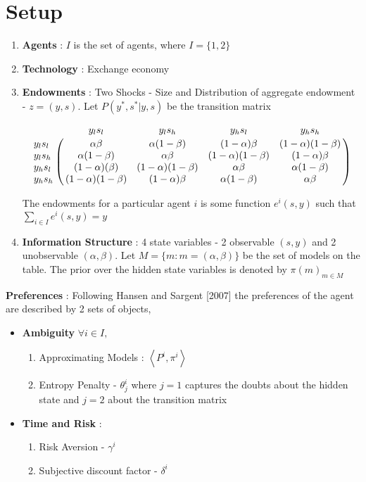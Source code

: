 \documentclass[12pt]{article}
\begin{document}
\section{Setup}
	\begin{enumerate}
		\item \textbf{Agents}  : $I$ is the  set of agents, where $I= \{1,2\}$
		\item \textbf{Technology} : Exchange economy
		\item \textbf{Endowments}  : Two Shocks - Size and Distribution of aggregate endowment - $z=(y,s)$. Let $P(y^{*},s^* | y,s)$ be the transition matrix

$$\bordermatrix{\text{}&y_ls_l&y_ls_h&y_hs_l&y_hs_h\cr
                y_ls_l&\alpha\beta&  \alpha(1-\beta)  & (1-\alpha)\beta& (1-\alpha)(1-\beta)\cr
                y_ls_h&   \alpha(1-\beta) &  \alpha\beta &(1-\alpha)(1-\beta) & (1-\alpha)\beta\cr
                y_hs_l&   (1-\alpha)(\beta) &  (1-\alpha)(1-\beta )&\alpha\beta & \alpha(1-\beta)\cr
                y_hs_h&  (1-\alpha)(1-\beta) &  (1-\alpha)\beta &\alpha(1-\beta) & \alpha\beta }$$

\noindent The endowments for a particular agent $i$ is some function $e^i(s,y)$ such that $\sum_{i \in I} e^{i}(s,y)=y$

\item \textbf{Information Structure} : 4 state variables  - 2 observable $(s,y)$ and  2 unobservable $(\alpha,\beta)$. Let $M=\{m : m=(\alpha,\beta)\}$ be the set of models on the table. The prior over the hidden state variables is denoted by $\pi(m)_{m \in M}$
 	\end{enumerate}
\textbf{Preferences} : Following Hansen and Sargent [2007] the preferences of the agent are described by 2 sets of objects, 
\begin{itemize}
	\item \textbf{Ambiguity}
%	
$\forall i \in I,$
\begin{enumerate}
	\item Approximating Models :   $\left\langle  P^i, \pi^i \right\rangle$
	\item Entropy Penalty - $\theta_j^i$ where $j=1$ captures the doubts about the hidden state and $j=2$ about the transition matrix
\end{enumerate}
\item \textbf{Time and Risk} :
\begin{enumerate}
	\item Risk Aversion - $\gamma^i$
	\item Subjective discount factor - $\delta^i$
\end{enumerate}
 \end{itemize}
\end{document}

